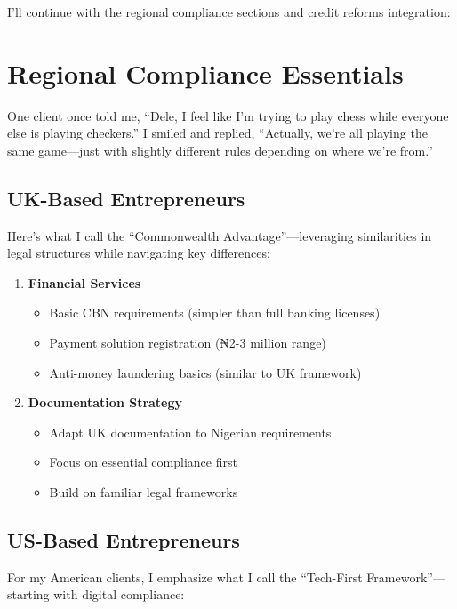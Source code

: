 I'll continue with the regional compliance sections and credit reforms integration:


\section{Regional Compliance Essentials}\label{sec:regional-compliance}

One client once told me, ``Dele, I feel like I'm trying to play chess while everyone else is playing checkers.'' I smiled and replied, ``Actually, we're all playing the same game—just with slightly different rules depending on where we're from.''

\subsection{UK-Based Entrepreneurs}\label{subsec:uk-compliance}

Here's what I call the ``Commonwealth Advantage''—leveraging similarities in legal structures while navigating key differences:

\begin{enumerate}
    \item \textbf{Financial Services}
    \begin{itemize}
        \item Basic CBN requirements (simpler than full banking licenses)
        \item Payment solution registration (₦2-3 million range)
        \item Anti-money laundering basics (similar to UK framework)
    \end{itemize}

    \item \textbf{Documentation Strategy}
    \begin{itemize}
        \item Adapt UK documentation to Nigerian requirements
        \item Focus on essential compliance first
        \item Build on familiar legal frameworks
    \end{itemize}
\end{enumerate}

\subsection{US-Based Entrepreneurs}\label{subsec:us-compliance}

For my American clients, I emphasize what I call the ``Tech-First Framework''—starting with digital compliance:

